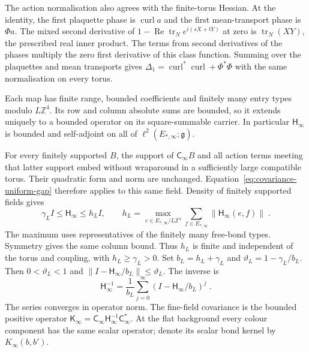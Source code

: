 \documentclass[11pt]{article}
\newcommand{\tr}{\operatorname{tr}}
\begin{document}
The action normalisation also agrees with the finite-torus Hessian. At the identity, the first plaquette phase is $\operatorname{curl}a$ and the first mean-transport phase is $\Phi a$. The mixed second derivative of $1-\operatorname{Re}\tr_N e^{i(sX+tY)}$ at zero is $\tr_N(XY)$, the prescribed real inner product. The terms from second derivatives of the phases multiply the zero first derivative of this class function. Summing over the plaquettes and mean transports gives $\Delta_1=\operatorname{curl}^*\operatorname{curl}+\Phi^*\Phi$ with the same normalisation on every torus.

Each map has finite range, bounded coefficients and finitely many entry types modulo $L\mathbb Z^4$. Its row and column absolute sums are bounded, so it extends uniquely to a bounded operator on its square-summable carrier. In particular $\mathsf H_\infty$ is bounded and self-adjoint on all of $\ell^2(E_{*,\infty};\mathfrak g)$.

For every finitely supported $B$, the support of $\mathsf C_\infty B$ and all action terms meeting that latter support embed without wraparound in a sufficiently large compatible torus. Their quadratic form and norm are unchanged. Equation~\eqref{eq:covariance-uniform-gap} therefore applies to this same field. Density of finitely supported fields gives
\begin{equation}\label{eq:bulk-uniform-gap}
    \gamma_L I\leq \mathsf H_\infty\leq h_L I,
    \qquad
    h_L=\max_{e\in E_{*,\infty}/L\mathbb Z^4}
        \sum_{f\in E_{*,\infty}}\|\mathsf H_\infty(e,f)\|\;.
\end{equation}
The maximum uses representatives of the finitely many free-bond types. Symmetry gives the same column bound. Thus $h_L$ is finite and independent of the torus and coupling, with $h_L\geq\gamma_L>0$. Set $b_L=h_L+\gamma_L$ and $\vartheta_L=1-\gamma_L/b_L$. Then $0<\vartheta_L<1$ and $\|I-\mathsf H_\infty/b_L\|\leq\vartheta_L$. The inverse is
\begin{equation}\label{eq:bulk-neumann-inverse}
    \mathsf H_\infty^{-1}
        =\frac{1}{b_L}\sum_{j=0}^{\infty}
            (I-\mathsf H_\infty/b_L)^j\;.
\end{equation}
The series converges in operator norm. The fine-field covariance is the bounded positive operator $\mathsf K_\infty=\mathsf C_\infty\mathsf H_\infty^{-1}\mathsf C_\infty^*$. At the flat background every colour component has the same scalar operator; denote its scalar bond kernel by $K_\infty(b,b')$.
\end{document}
